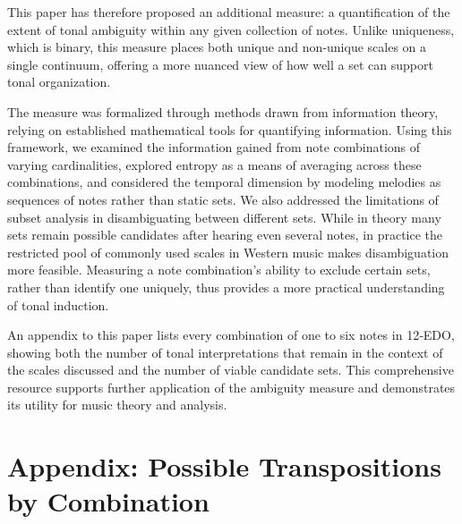 \documentclass[10pt,twocolumn]{article}
\numberwithin{equation}{section} %
\begin{document}
    This paper has therefore proposed an additional measure: a quantification of the extent of tonal ambiguity within any given collection of notes.
    Unlike uniqueness, which is binary, this measure places both unique and non‑unique scales on a single continuum, offering a more nuanced view of how well a set can support tonal organization.

    The measure was formalized through methods drawn from information theory, relying on established mathematical tools for quantifying information.
    Using this framework, we examined the information gained from note combinations of varying cardinalities, explored entropy as a means of averaging across these combinations, and considered the temporal dimension by modeling melodies as sequences of notes rather than static sets.
    We also addressed the limitations of subset analysis in disambiguating between different sets.
    While in theory many sets remain possible candidates after hearing even several notes, in practice the restricted pool of commonly used scales in Western music makes disambiguation more feasible.
    Measuring a note combination's ability to exclude certain sets, rather than identify one uniquely, thus provides a more practical understanding of tonal induction.

    An appendix to this paper lists every combination of one to six notes in 12‑EDO, showing both the number of tonal interpretations that remain in the context of the scales discussed and the number of viable candidate sets.
    This comprehensive resource supports further application of the ambiguity measure and demonstrates its utility for music theory and analysis.

    
    

    \clearpage

    \newcommand{\sone}[1]{\cellcolor{gray!20}{#1}} %
    \newcommand{\diag}{\rowcolor{green!12}}        %

    \section*{Appendix: Possible Transpositions by Combination}

    \begingroup
    \footnotesize                           %
\end{document}
